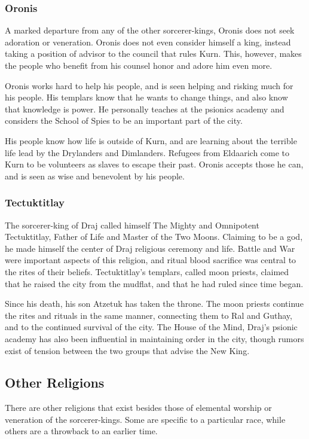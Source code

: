 \subsubsection{Oronis}
A marked departure from any of the other sorcerer-kings, Oronis does not seek adoration or veneration. Oronis does not even consider himself a king, instead taking a position of advisor to the council that rules Kurn. This, however, makes the people who benefit from his counsel honor and adore him even more.

Oronis works hard to help his people, and is seen helping and risking much for his people. His templars know that he wants to change things, and also know that knowledge is power. He personally teaches at the psionics academy and considers the School of Spies to be an important part of the city.

His people know how life is outside of Kurn, and are learning about the terrible life lead by the Drylanders and Dimlanders. Refugees from Eldaarich come to Kurn to be volunteers as slaves to escape their past. Oronis accepts those he can, and is seen as wise and benevolent by his people.

\subsubsection{Tectuktitlay}
The sorcerer-king of Draj called himself The Mighty and Omnipotent Tectuktitlay, Father of Life and Master of the Two Moons. Claiming to be a god, he made himself the center of Draj religious ceremony and life. Battle and War were important aspects of this religion, and ritual blood sacrifice was central to the rites of their beliefs. Tectuktitlay's templars, called moon priests, claimed that he raised the city from the mudflat, and that he had ruled since time began.

Since his death, his son Atzetuk has taken the throne. The moon priests continue the rites and rituals in the same manner, connecting them to Ral and Guthay, and to the continued survival of the city. The House of the Mind, Draj's psionic academy has also been influential in maintaining order in the city, though rumors exist of tension between the two groups that advise the New King.

\subsection{Other Religions}
There are other religions that exist besides those of elemental worship or veneration of the sorcerer-kings. Some are specific to a particular race, while others are a throwback to an earlier time.

